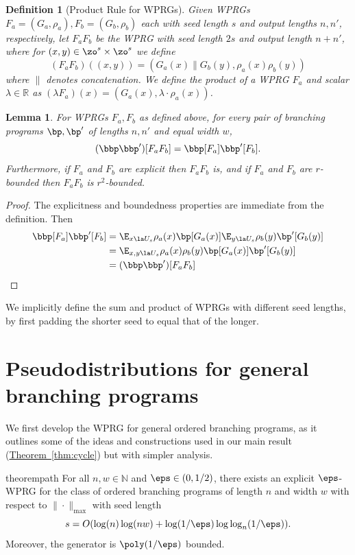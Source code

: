 \documentclass[11pt]{article}
\newcommand{\expref}[2]{\texorpdfstring{\hyperref[#2]{#1~\ref{#2}}}{#1~\ref{#2}}}
\newtheorem{lemma}[theorem]{Lemma}
\newtheorem{definition}[theorem]{Definition}
\newcommand{\R}{{\mathbb R}}
\newcommand{\N}{{\mathbb N}}
\begin{document}
\begin{definition}[Product Rule for WPRGs]\label{def:prodrule}
Given WPRGs $F_a=(G_a,\rho_a),F_b=(G_b,\rho_b)$ each with seed length $s$ and output lengths $n,n'$, respectively, %
let $F_aF_b$ be the WPRG with seed length $2s$ and output length $n+n'$, where for $(x,y)\in \zo^s\times\zo^s$ we define
\[(F_a F_b)((x,y)) = (G_a(x)\|G_b(y),\rho_a(x)\rho_b(y))\]
where $\|$ denotes concatenation. We define the product of a WPRG $F_a$ and scalar $\lambda \in \R$ as $(\lambda F_a)(x)=(G_a(x),\lambda\cdot\rho_a(x))$.
\end{definition}
\begin{lemma}
For WPRGs $F_a,F_b$ as defined above, for every pair of branching programs $\bp,\bp'$ of lengths $n,n'$ and equal width $w$,
$$(\bbp\bbp')[F_aF_b]=\bbp[F_a]\bbp'[F_b].$$
Furthermore, if $F_a$ and $F_b$ are explicit then $F_aF_b$ is, and if $F_a$ and $F_b$ are $r$-bounded then $F_aF_b$ is $r^2$-bounded.
\end{lemma}
\begin{proof}
The explicitness and boundedness properties are immediate from the definition. 
Then %
\begin{align*}
\bbp[F_a]\bbp'[F_b] &= \E_{x\la U_s}\rho_a(x)\bp[G_a(x)]\E_{y\la U_s}\rho_b(y)\bp'[G_b(y)]\\
&= \E_{x,y\la U_s}\rho_a(x)\rho_b(y)\bp[G_a(x)]\bp'[G_b(y)]\\
&= (\bbp\bbp')[F_aF_b] \qedhere
\end{align*}
\end{proof}
We implicitly define the sum and product of WPRGs with different seed lengths, by first padding the shorter seed to equal that of the longer.
    
\section{Pseudodistributions for general branching programs}\label{sec:path}
    We first develop the WPRG for general ordered branching programs, as it outlines some of the ideas and constructions used in our main result (\expref{Theorem}{thm:cycle}) but with simpler analysis.
    \begin{restatable}{theorem}{path}\label{thm:path}
        For all $n,w \in \N$ and $\eps \in (0,1/2)$, there exists an explicit $\eps$-WPRG for the class of ordered branching programs of length $n$ and width $w$ with respect to $\|\cdot\|_{\max}$ with seed length
        \[s=O(\log(n)\log(nw)+\log(1/\eps)\log\log_{n}(1/\eps)).\]
        Moreover, the generator is $\poly(1/\eps)$ bounded.
    \end{restatable}
\end{document}
